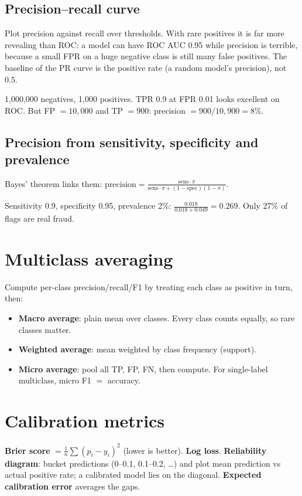 \subsection{Precision--recall curve}
Plot precision against recall over thresholds. With rare positives it is far more revealing than ROC: a model can have ROC AUC 0.95
while precision is terrible, because a small FPR on a huge negative class is still many false positives. The baseline of the PR curve
is the positive rate (a random model's precision), not 0.5.
\begin{example}
1{,}000{,}000 negatives, 1{,}000 positives. TPR 0.9 at FPR 0.01 looks excellent on ROC. But FP $= 10{,}000$ and TP $= 900$: precision
$= 900/10{,}900 = 8\%$.
\end{example}

\subsection{Precision from sensitivity, specificity and prevalence}
Bayes' theorem links them: $\text{precision} = \frac{\text{sens}\cdot\pi}{\text{sens}\cdot\pi + (1 - \text{spec})(1 - \pi)}$.
\begin{example}
Sensitivity 0.9, specificity 0.95, prevalence 2\%: $\frac{0.018}{0.018 + 0.049} = 0.269$. Only 27\% of flags are real fraud.
\end{example}

\section{Multiclass averaging}
Compute per-class precision/recall/F1 by treating each class as positive in turn, then:
\begin{itemize}
\item \textbf{Macro average}: plain mean over classes. Every class counts equally, so rare classes matter.
\item \textbf{Weighted average}: mean weighted by class frequency (support).
\item \textbf{Micro average}: pool all TP, FP, FN, then compute. For single-label multiclass, micro F1 $=$ accuracy.
\end{itemize}

\section{Calibration metrics}
\textbf{Brier score} $=\frac1n\sum(p_i - y_i)^2$ (lower is better). \textbf{Log loss}. \textbf{Reliability diagram}: bucket
predictions (0--0.1, 0.1--0.2, \dots) and plot mean prediction vs actual positive rate; a calibrated model lies on the diagonal.
\textbf{Expected calibration error} averages the gaps.

